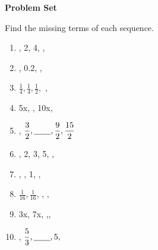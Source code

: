 \textbf{Problem Set}

\vspce

Find the missing terms of each sequence. 

\begin{enumerate}[label = \arabic*. ]

\item {}, 2, 4, \blank, \blank
\vspce
\item {}, 0.2, \blank, \blank
\vspce
\item \hspce  $\displaystyle \frac{1}{4}, \frac{1}{4}, \frac{1}{2}, $  \blank, \blank
\vspce
\item \hspce  5x, \blank, 10x, \blank 
\vspce
\item \hspce  \blank,   $\displaystyle \frac{3}{2}, \underline{\hspace{2em}}, \frac{9}{2}, \frac{15}{2}$ 

\item \hspce  \blank, 2, 3, 5, \blank, \blank
\vspce
\item {}, \blank, 1, \blank, \blank 
\vspce
\item \hspce  $\displaystyle \frac{1}{16}, \frac{1}{16}$,   \blank, \blank, \blank
\vspce
\item \hspce  3x, 7x, \blank,\blank,  \blank 
\vspce
\item \hspce  \blank,   $\displaystyle \frac{5}{3}, \underline{\hspace{2em}},5,$ \blank


\end{enumerate}


 



